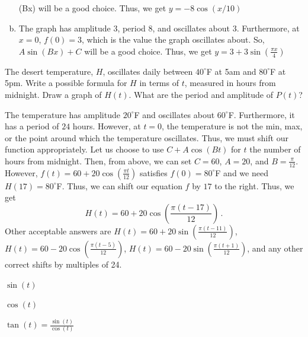 \documentclass[11pt]{exam}
\begin{document}
\begin{questions}
\begin{solution}
\begin{enumerate}[(a)]
    \cos(Bx)\) will be a good choice. Thus, we get \(y = -8\cos(x/10)\)
  \item The graph has amplitude \(3\), period \(8\), and oscillates
    about \(3\). Furthermore, at \(x=0\), \(f(0)=3\), which is the
    value the graph oscillates about. So, \(A \sin(Bx)+C\) will be a
    good choice. Thus, we get \(y = 3+3 \sin(\frac{\pi x}{4})\)
  \end{enumerate}
\end{solution}
\question The desert temperature, $H$, oscillates daily between
$40^\circ$F at 5am and $80^\circ$F at 5pm.  Write a possible formula
for $H$ in terms of $t$, measured in hours from midnight. Draw a graph
of \(H(t)\). What are the period and amplitude of \(P(t)\)?
\begin{solution}
  The temperature has amplitude \(20^\circ\)F and oscillates about
  \(60^\circ\)F. Furthermore, it has a period of \(24\)
  hours. However, at \(t=0\), the temperature is not the min, max, or
  the point around which the temperature oscillates. Thus, we must
  shift our function appropriately. Let us choose to use
  \(C+A\cos(Bt)\) for \(t\) the number of hours from midnight. Then, from above, we can set \(C=60\), \(A=20\),
  and \(B = \frac{\pi}{12}\). However, \(f(t) = 60+20\cos(\frac{\pi
    t}{12})\) satisfies \(f(0) = 80^\circ\)F and we need \(H(17) =
  80^\circ\)F. Thus, we can shift our equation \(f\) by \(17\) to the
  right. Thus, we get \[
    H(t) = 60+20\cos\left( \frac{\pi(t-17)}{12} \right)\,.
  \]
  Other acceptable answers are \(H(t) = 60+20\sin(\frac{\pi(t-11)}{12})\),
  \(H(t) = 60-20\cos(\frac{\pi(t-5)}{12})\), \(H(t) =
  60-20\sin(\frac{\pi(t+1)}{12})\), and any other correct shifts by
  multiples of 24.
\end{solution}
\pagebreak
\question 
	\begin{multicols}{3}
	$\sin(t)$
	
	$\cos(t)$
	
	$\tan(t)=\frac{\sin(t)}{\cos(t)}$
	\end{multicols}
	
	
	\vspace*{-.6cm}
	

\end{questions}
\end{document}
